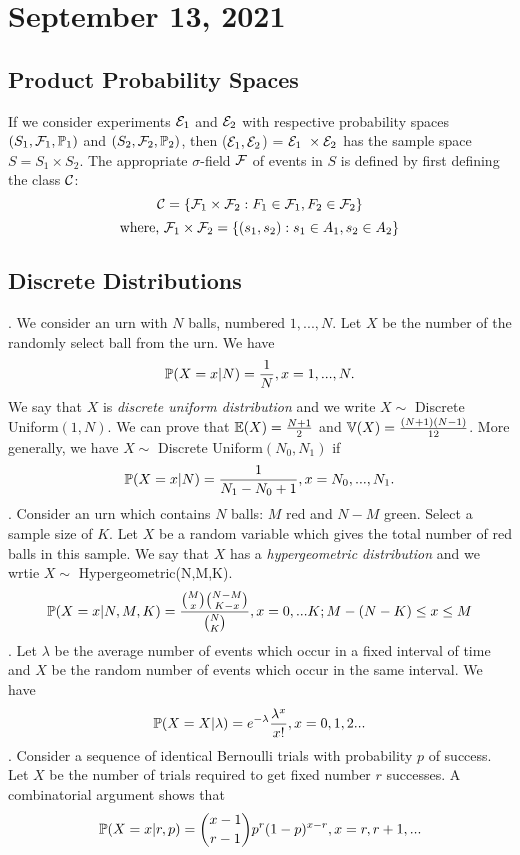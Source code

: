 \section{September 13, 2021}
\subsection{Product Probability Spaces}
If we consider experiments $\mathcal E_1$ and $\mathcal E_2$ with respective probability spaces $(S_1,\mathcal F_1, \mathbb P_1)$ and $(S_2,\mathcal F_2, \mathbb P_2)$, then ($\mathcal E_1, \mathcal E_2$) = $\mathcal E_1\ \times \mathcal E_2$ has the sample space $S = S_1 \times S_2$. The appropriate $\sigma$-field $\mathcal F$ of events in $S$ is defined by first defining the class $\mathcal C$:
$$
\mathcal C = \{ \mathcal F_1 \times \mathcal F_2: F_1 \in \mathcal F_1, F_2 \in \mathcal F_2 \}
$$
$$
\text{where, } \mathcal F_1 \times \mathcal F_2 = \{ (s_1,s_2): s_1 \in A_1, s_2 \in A_2 \}
$$
\subsection{Discrete Distributions}
. We consider an urn with $N$ balls, numbered $1,...,N$. Let $X$ be the number of the randomly select ball from the urn. We have
$$
\mathbb P(X=x|N) = \frac{1}{N}, x = 1,...,N.
$$
We say that $X$ is \textit{discrete uniform distribution} and we write $X \sim$ Discrete Uniform$(1,N)$. We can prove that $\mathbb E(X) = \frac{N+1}{2}$ and $\mathbb V(X) = \frac{(N+1)(N-1)}{12}$.
More generally, we have $X \sim$ Discrete Uniform$(N_0,N_1)$ if 
$$
\mathbb P(X=x|N) = \frac{1}{N_1 - N_0 +1}, x = N_0,...,N_1.
$$
. Consider an urn which contains $N$ balls: $M$ red and $N-M$ green. Select a sample size of $K$. Let $X$ be a random variable which gives the total number of red balls in this sample. 
We say that $X$ has a \textit{hypergeometric distribution} and we wrtie $X \sim$ Hypergeometric(N,M,K).
$$
\mathbb P(X=x|N,M,K) = \frac{{M \choose x}{N-M \choose K-x}}{{N \choose K}}, x=0,...K; M - (N-K) \leq x \leq M
$$
. Let $\lambda$ be the average number of events which occur in a fixed interval of time and $X$ be the random number of events which occur in the same interval. We have
$$
\mathbb P(X=X|\lambda) = e^{-\lambda}\frac{\lambda^{x}}{x!},  x =0,1,2...
$$
. Consider a sequence of identical Bernoulli trials with probability $p$ of success. Let $X$ be the number of trials required to get fixed number $r$ successes. A combinatorial argument shows that
$$
\mathbb P(X=x|r,p) = {x-1 \choose r-1}p^{r}(1-p)^{x-r}, x=r,r+1,...
$$
